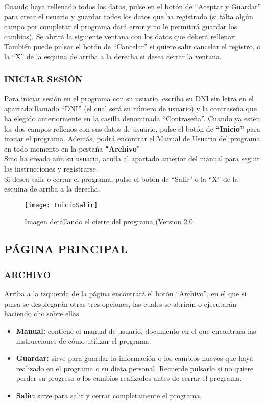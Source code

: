Cuando haya rellenado todos los datos, pulse en el botón de “Aceptar y Guardar” para crear el usuario y guardar todos los datos que ha registrado (si falta algún campo por completar el programa dará error y no le permitirá guardar los cambios).
Se abrirá la siguiente ventana con los datos que deberá rellenar:
También puede pulsar el botón de “Cancelar” si quiere salir cancelar el registro, o la “X” de la esquina de arriba a la derecha si desea cerrar la ventana.
\subsubsection{INICIAR SESIÓN}
Para iniciar sesión en el programa con su usuario, escriba su DNI sin letra en el apartado llamado “DNI” (el cual será su número de usuario) y la contraseña que ha elegido anteriormente en la casilla denominada “Contraseña”. Cuando ya estén los dos campos rellenos con sus datos de usuario, pulse el botón de \textbf{“Inicio”} para iniciar el programa. Además, podrá encontrar el Manual de Usuario del programa en todo momento en la pestaña \textbf{"Archivo"}\\
Sino ha creado aún su usuario, acuda al apartado anterior del manual para seguir las instrucciones y registrarse.\\
Si desea salir o cerrar el programa, pulse el botón de “Salir” o la “X” de la esquina de arriba a la derecha.
\begin{figure}[htb]
\centering
\texttt{[image: InicioSalir]} 
\caption{Imagen detallando el cierre del programa (Version 2.0}
\end{figure}

\subsection{PÁGINA PRINCIPAL}
\subsubsection{ARCHIVO}
Arriba a la izquierda de la página encontrará el botón “Archivo”, en el que si pulsa se desplegarán otras tres opciones, las cuales se abrirán o ejecutarán haciendo clic sobre ellas.
\begin{itemize}
\item	\textbf{Manual:} contiene el manual de usuario, documento en el que encontrará las instrucciones de cómo utilizar el programa.
\item	\textbf{Guardar:} sirve para guardar la información o los cambios nuevos que haya realizado en el programa o su dieta personal. Recuerde pulsarlo si no quiere perder su progreso o los cambios realizados antes de cerrar el programa.
\item	\textbf{Salir:} sirve para salir y cerrar completamente el programa.
\end{itemize}
